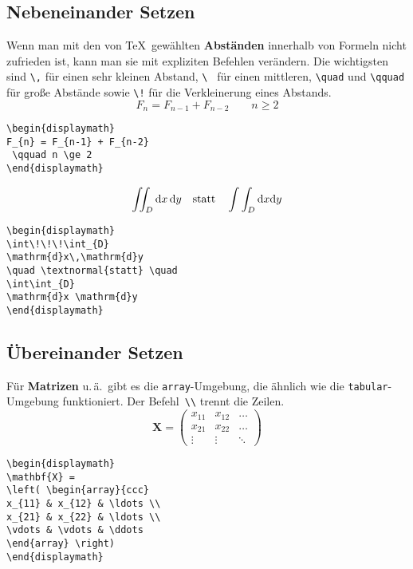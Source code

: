 \subsection{Nebeneinander Setzen}
 
Wenn man mit den von \TeX\ gewählten \textbf{Abständen}
innerhalb von Formeln nicht zufrieden ist, kann man sie mit
expliziten Befehlen verändern. Die wichtigsten sind
\lstinline|\,| für einen sehr kleinen Abstand,
\lstinline|\ | für einen mittleren,
\lstinline|\quad| und \lstinline|\qquad| für große Abstände sowie
\lstinline|\!| für die Verkleinerung eines Abstands.
\exa
\begin{displaymath}
F_{n} = F_{n-1} + F_{n-2}
 \qquad n \ge 2
\end{displaymath}
\exb
\begin{verbatim}
\begin{displaymath}
F_{n} = F_{n-1} + F_{n-2}
 \qquad n \ge 2
\end{displaymath}
\end{verbatim}
\exc
 
\exa
\begin{displaymath}
\int\!\!\!\int_{D} \mathrm{d}x\,\mathrm{d}y
\quad \textnormal{statt} \quad
\int\int_{D} \mathrm{d}x \mathrm{d}y
\end{displaymath}
\exb
\begin{verbatim}
\begin{displaymath}
\int\!\!\!\int_{D} 
\mathrm{d}x\,\mathrm{d}y
\quad \textnormal{statt} \quad
\int\int_{D} 
\mathrm{d}x \mathrm{d}y
\end{displaymath}
\end{verbatim}
\exc


\subsection{Übereinander Setzen}

Für \textbf{Matrizen} u.\,ä.\ gibt es die
\texttt{array}-Umgebung, die ähnlich wie die
\texttt{tabular}-Umgebung funktioniert.
Der Befehl~\lstinline|\\| trennt die Zeilen.
\exa
\begin{displaymath}
\mathbf{X} =
\left( \begin{array}{ccc}
x_{11} & x_{12} & \ldots \\
x_{21} & x_{22} & \ldots \\
\vdots & \vdots & \ddots
\end{array} \right)
\end{displaymath}
\exb
\begin{verbatim}
\begin{displaymath}
\mathbf{X} =
\left( \begin{array}{ccc}
x_{11} & x_{12} & \ldots \\
x_{21} & x_{22} & \ldots \\
\vdots & \vdots & \ddots
\end{array} \right)
\end{displaymath}
\end{verbatim}
\exc

